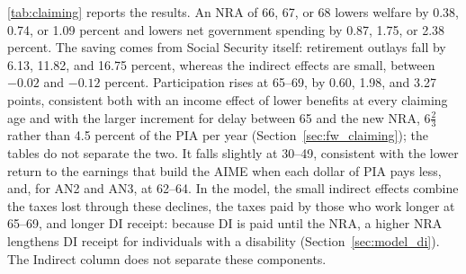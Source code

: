 \autoref{tab:claiming} reports the results. An NRA of 66, 67, or 68 lowers welfare by 0.38, 0.74, or 1.09 percent and lowers net government spending by 0.87, 1.75, or 2.38 percent. The saving comes from Social Security itself: retirement outlays fall by 6.13, 11.82, and 16.75 percent, whereas the indirect effects are small, between $-0.02$ and $-0.12$ percent. Participation rises at 65--69, by 0.60, 1.98, and 3.27 points, consistent both with an income effect of lower benefits at every claiming age and with the larger increment for delay between 65 and the new NRA, $6\tfrac{2}{3}$ rather than 4.5 percent of the PIA per year (Section~\ref{sec:fw_claiming}); the tables do not separate the two. It falls slightly at 30--49, consistent with the lower return to the earnings that build the AIME when each dollar of PIA pays less, and, for AN2 and AN3, at 62--64. In the model, the small indirect effects combine the taxes lost through these declines, the taxes paid by those who work longer at 65--69, and longer DI receipt: because DI is paid until the NRA, a higher NRA lengthens DI receipt for individuals with a disability (Section~\ref{sec:model_di}). The Indirect column does not separate these components.

